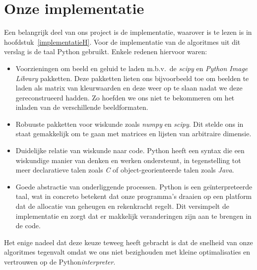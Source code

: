 \documentclass[11pt]{uvamath}
\theoremstyle{plain}
\theoremstyle{definition}
\theoremstyle{remark}
\begin{document}
\section*{Onze implementatie}
Een belangrijk deel van ons project is de implementatie, waarover is te lezen is in 
\mbox{hoofdstuk \ref{implementatieH}}. 
Voor de implementatie van de algoritmes uit dit verslag is de taal Python gebruikt.
Enkele redenen hiervoor waren:
\begin{itemize}
\item Voorzieningen om beeld en geluid te laden m.b.v.~de \emph{scipy}\cite{scipy} en \emph{Python Image Library}\cite{pil} pakketten.
  Deze pakketten lieten ons bijvoorbeeld toe om beelden te laden als matrix van kleurwaarden en deze weer op te slaan
  nadat we deze gereconstrueerd hadden. Zo hoefden we ons niet te bekommeren om het inladen van de verschillende beeldformaten.
\item Robuuste pakketten voor wiskunde zoals \emph{numpy}\cite{numpy} en \emph{scipy}. Dit stelde ons in staat gemakkelijk om te gaan met matrices en lijsten van arbitraire dimensie.
\item Duidelijke relatie van wiskunde naar code. Python heeft een syntax die een wiskundige manier van denken en werken
  ondersteunt, in tegenstelling tot meer declaratieve talen zoals \emph{C} of object-georienteerde talen zoals \emph{Java}.
\item Goede abstractie van onderliggende processen. Python is een ge\"interpreteerde taal, wat in concreto betekent
  dat onze programma's draaien op een platform dat de allocatie van geheugen en rekenkracht regelt. Dit versimpelt
  de implementatie en zorgt dat er makkelijk veranderingen zijn aan te brengen in de code.
\end{itemize}
Het enige nadeel dat deze keuze teweeg heeft gebracht is dat de snelheid van onze algoritmes tegenvalt
omdat we ons niet bezighouden met kleine optimalisaties en vertrouwen op de Python\emph{interpreter}.















\appendix
\end{document}
